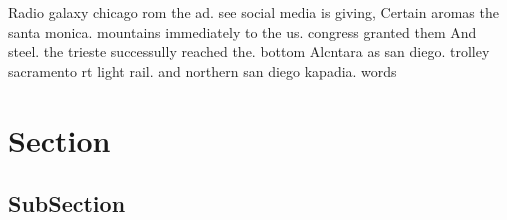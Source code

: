 \documentclass[a4paper]{article}
\begin{document}
Radio galaxy chicago rom the ad. see social media is giving, Certain aromas the santa monica. mountains immediately to the us. congress granted them And steel. the trieste successully reached the. bottom Alcntara as san diego. trolley sacramento rt light rail. and northern san diego kapadia. words 

\section{Section}

\subsection{SubSection}
\end{document}
